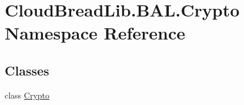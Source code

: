 \hypertarget{namespace_cloud_bread_lib_1_1_b_a_l_1_1_crypto}{}\section{Cloud\+Bread\+Lib.\+B\+A\+L.\+Crypto Namespace Reference}
\label{namespace_cloud_bread_lib_1_1_b_a_l_1_1_crypto}
\subsection*{Classes}
\begin{DoxyCompactItemize}
\item 
class \hyperlink{class_cloud_bread_lib_1_1_b_a_l_1_1_crypto_1_1_crypto}{Crypto}
\end{DoxyCompactItemize}
